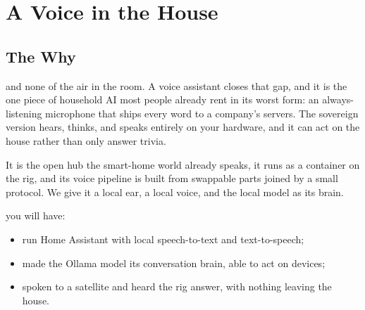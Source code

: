 
\chapter{A Voice in the House}
\vspace{1.5em}


\section{The Why}

 and none of the air in the room. A voice
assistant closes that gap, and it is the one piece of household AI most people
already rent in its worst form: an always-listening microphone that ships every
word to a company's servers. The sovereign version hears, thinks, and speaks
entirely on your hardware, and it can act on the house rather than only answer
trivia.

 It is the open hub the smart-home
world already speaks, it runs as a container on the rig, and its voice pipeline is
built from swappable parts joined by a small protocol. We give it a local ear, a
local voice, and the local model as its brain.

 you will have:
\begin{itemize}
    \item run Home Assistant with local speech-to-text and text-to-speech;
    \item made the Ollama model its conversation brain, able to act on devices;
    \item spoken to a satellite and heard the rig answer, with nothing leaving the house.
\end{itemize}



